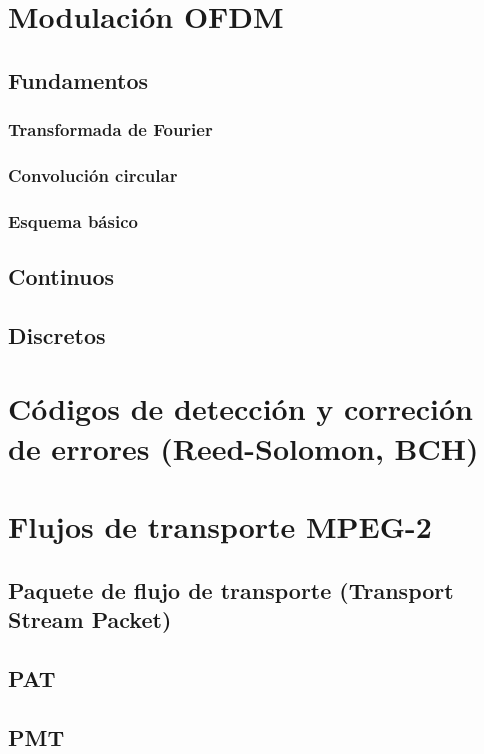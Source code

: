 \section{Modulación OFDM}

\subsection{Fundamentos}

\subsubsection{Transformada de Fourier}

\subsubsection{Convoluci\'on circular}


\subsubsection{Esquema b\'asico}

\subsection{Continuos}

\subsection{Discretos}

\section{Códigos de detección y correción de errores (Reed-Solomon, BCH)}


\section{Flujos de transporte MPEG-2}
\subsection{Paquete de flujo de transporte (Transport Stream Packet)}
\subsection{PAT}
\subsection{PMT}

